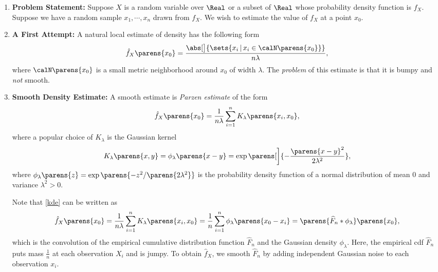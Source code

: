 \documentclass[12pt]{article}
\begin{document}
\begin{enumerate}[label=\textbf{\arabic*.}]

	\item \textbf{Problem Statement:} Suppose $X$ is a random variable over $\Real$ or a subset of $\Real$ whose probability density function is $f_X$. Suppose we have a random sample $x_1, \cdots, x_n$ drawn from $f_X$. We wish to estimate the value of $f_X$ at a point $x_0$. 
	
	\item \textbf{A First Attempt:} A natural local estimate of density has the following form 
	\begin{align*}
		\hat{f}_X \parens{x_0} = \frac{\abs[\big]{\sets{x_i \,\vert\, x_i \in \calN \parens{x_0}}}}{n \lambda}, 
	\end{align*}
	where $\calN \parens{x_0}$ is a small metric neighborhood around $x_0$ of width $\lambda$. The \textit{problem} of this estimate is that it is bumpy and \textit{not} smooth. 
	
	\item \textbf{Smooth Density Estimate:} A smooth estimate is \textit{Parzen estimate} of the form 
	\begin{align}\label{kde}
		\hat{f}_X \parens{x_0} = \frac{1}{n \lambda} \sum_{i=1}^n K_{\lambda} \parens{x_i, x_0}, 
	\end{align}
	where a popular choice of $K_\lambda$ is the Gaussian kernel 
	\begin{align*}
		K_{\lambda} \parens{x, y} = \phi_{\lambda} \parens{x - y} = \exp \parens[\bigg]{- \frac{\parens{x - y}^2}{2 \lambda^2}}, 
	\end{align*}
	where $\phi_{\lambda} \parens{z} = \exp \parens{-z^2/\parens{2 \lambda^2}}$ is the probability density function of a normal distribution of mean 0 and variance $\lambda^2 > 0$. 
	
	Note that \eqref{kde} can be written as 
	\begin{align*}
		\hat{f}_X \parens{x_0} = \frac{1}{n \lambda} \sum_{i=1}^n K_{\lambda} \parens{x_i, x_0} = \frac{1}{n} \sum_{i=1}^n \phi_\lambda \parens{x_0 - x_i} = \parens{\widehat{F}_n * \phi_\lambda} \parens{x_0}, 
	\end{align*}
	which is the convolution of the empirical cumulative distribution function $\widehat{F}_n$ and the Gaussian density $\phi_{\lambda}$. Here, the empirical cdf $\widehat{F}_n$ puts mass $\frac{1}{n}$ at each observation $X_i$ and is jumpy. To obtain $\hat{f}_X$, we smooth $\widehat{F}_n$ by adding independent Gaussian noise to each observation $x_i$. 
	

\end{enumerate}
\end{document}
